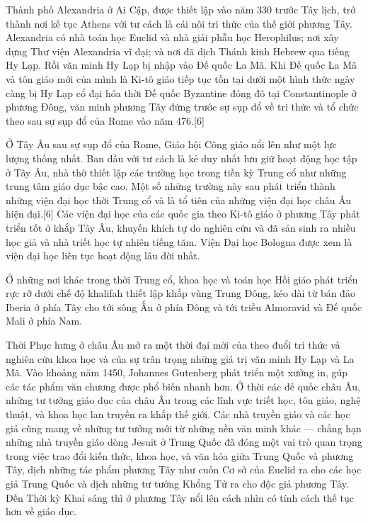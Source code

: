 \documentclass[../thesis.tex]{subfiles}
\begin{document}
Thành phố Alexandria ở Ai Cập, được thiết lập vào năm 330 trước Tây lịch, trở thành nơi kế tục Athens với tư cách là cái nôi tri thức của thế giới phương Tây. Alexandria có nhà toán học Euclid và nhà giải phẫu học Herophilus; nơi xây dựng Thư viện Alexandria vĩ đại; và nơi đã dịch Thánh kinh Hebrew qua tiếng Hy Lạp. Rồi văn minh Hy Lạp bị nhập vào Đế quốc La Mã. Khi Đế quốc La Mã và tôn giáo mới của mình là Ki-tô giáo tiếp tục tồn tại dưới một hình thức ngày càng bị Hy Lạp cổ đại hóa thời Đế quốc Byzantine đóng đô tại Constantinople ở phương Đông, văn minh phương Tây đứng trước sự sụp đổ về tri thức và tổ chức theo sau sự sụp đổ của Rome vào năm 476.[6]

Ở Tây Âu sau sự sụp đổ của Rome, Giáo hội Công giáo nổi lên như một lực lượng thống nhất. Ban đầu với tư cách là kẻ duy nhất lưu giữ hoạt động học tập ở Tây Âu, nhà thờ thiết lập các trường học trong tiền kỳ Trung cổ như những trung tâm giáo dục bậc cao. Một số những trường này sau phát triển thành những viện đại học thời Trung cổ và là tổ tiên của những viện đại học châu Âu hiện đại.[6] Các viện đại học của các quốc gia theo Ki-tô giáo ở phương Tây phát triển tốt ở khắp Tây Âu, khuyến khích tự do nghiên cứu và đã sản sinh ra nhiều học giả và nhà triết học tự nhiên tiếng tăm. Viện Đại học Bologna được xem là viện đại học liên tục hoạt động lâu đời nhất.

Ở những nơi khác trong thời Trung cổ, khoa học và toán học Hồi giáo phát triển rực rỡ dưới chế độ khalifah thiết lập khắp vùng Trung Đông, kéo dài từ bán đảo Iberia ở phía Tây cho tới sông Ấn ở phía Đông và tới triều Almoravid và Đế quốc Mali ở phía Nam.

Thời Phục hưng ở châu Âu mở ra một thời đại mới của theo đuổi tri thức và nghiên cứu khoa học và của sự trân trọng những giá trị văn minh Hy Lạp và La Mã. Vào khoảng năm 1450, Johannes Gutenberg phát triển một xưởng in, gúp các tác phẩm văn chương được phổ biến nhanh hơn. Ở thời các đế quốc châu Âu, những tư tưởng giáo dục của châu Âu trong các lĩnh vực triết học, tôn giáo, nghệ thuật, và khoa học lan truyền ra khắp thế giới. Các nhà truyền giáo và các học giả cũng mang về những tư tưởng mới từ những nền văn minh khác — chẳng hạn những nhà truyền giáo dòng Jesuit ở Trung Quốc đã đóng một vai trò quan trọng trong việc trao đổi kiến thức, khoa học, và văn hóa giữa Trung Quốc và phương Tây, dịch những tác phẩm phương Tây như cuốn Cơ sở của Euclid ra cho các học giả Trung Quốc và dịch những tư tưởng Khổng Tử ra cho độc giả phương Tây. Đến Thời kỳ Khai sáng thì ở phương Tây nổi lên cách nhìn có tính cách thế tục hơn về giáo dục.
\end{document}
